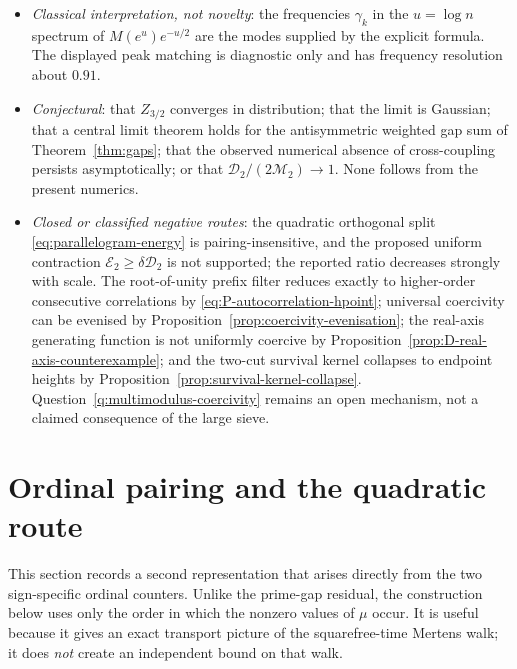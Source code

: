 \documentclass[11pt]{amsart}
\numberwithin{equation}{section}
\theoremstyle{plain}
\theoremstyle{definition}
\theoremstyle{remark}
\begin{document}
\begin{itemize}[leftmargin=1.6em]
identities checked there are proved separately and do not depend on those
counts.
\item \emph{Classical interpretation, not novelty}: the frequencies $\gamma_k$
in the $u=\log n$ spectrum of $M(e^u)e^{-u/2}$ are the modes supplied by the
explicit formula. The displayed peak matching is diagnostic only and has
frequency resolution about $0.91$.
\item \emph{Conjectural}: that $Z_{3/2}$ converges in distribution; that the
limit is Gaussian; that a central limit theorem holds for the antisymmetric
weighted gap sum of Theorem~\ref{thm:gaps}; that the observed numerical
absence of cross-coupling persists asymptotically; or that
$\mathcal D_2/(2\mathcal M_2)\to1$. None follows from the present numerics.
\item \emph{Closed or classified negative routes}: the quadratic orthogonal split
\eqref{eq:parallelogram-energy} is pairing-insensitive, and the proposed
uniform contraction $\mathcal E_2\ge\delta\mathcal D_2$ is not supported; the
reported ratio decreases strongly with scale.  The root-of-unity prefix filter
reduces exactly to higher-order consecutive correlations by
\eqref{eq:P-autocorrelation-hpoint}; universal coercivity can be evenised by
Proposition~\ref{prop:coercivity-evenisation}; the real-axis generating
function is not uniformly coercive by Proposition~\ref{prop:D-real-axis-counterexample};
and the two-cut survival kernel collapses to endpoint heights by
Proposition~\ref{prop:survival-kernel-collapse}.  Question~\ref{q:multimodulus-coercivity}
remains an open mechanism, not a claimed consequence of the large sieve.
\end{itemize}


\section{Ordinal pairing and the quadratic route}
\label{sec:ordinal-pairing}

This section records a second representation that arises directly from the two
sign-specific ordinal counters.  Unlike the prime-gap residual, the construction
below uses only the order in which the nonzero values of $\mu$ occur.  It is useful
because it gives an exact transport picture of the squarefree-time Mertens walk;
it does \emph{not} create an independent bound on that walk.
\end{document}
